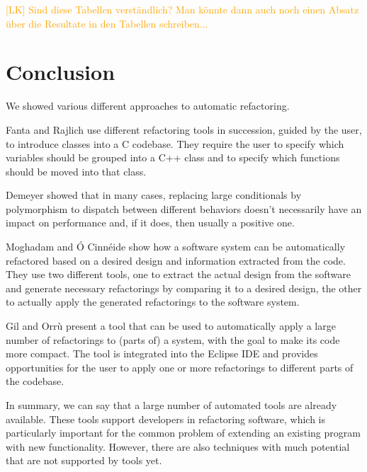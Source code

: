 \documentclass[conference,compsoc,a4paper]{IEEEtran}
\newcommand{\lk}[1]{\textcolor{orange}{[LK] #1}}
\begin{document}
\lk{Sind diese Tabellen verständlich? Man könnte dann auch noch einen Absatz über die Resultate in den Tabellen schreiben...}

\section{Conclusion}

We showed various different approaches to automatic refactoring.

Fanta and Rajlich \cite{cpp} use different refactoring tools in succession, guided by the user, to introduce classes 
into a C codebase. They require the user to specify which variables should be grouped into a C++ class and to specify 
which functions should be moved into that class.

Demeyer \cite{polymorphism} showed that in many cases, replacing large conditionals by polymorphism to dispatch between 
different behaviors doesn't necessarily have an impact on performance and, if it does, then usually a positive one.

Moghadam and Ó Cinnéide \cite{design-diff} show how a software system can be automatically refactored based on a 
desired design and information extracted from the code. They use two different tools, one to extract the actual design 
from the software and generate necessary refactorings by comparing it to a desired design, the other to actually apply 
the generated refactorings to the software system.

Gil and Orrù \cite{sparta} present a tool that can be used to automatically apply a large number of refactorings to 
(parts of) a system, with the goal to make its code more compact. The tool is integrated into the Eclipse IDE and 
provides opportunities for the user to apply one  or more refactorings to different parts of the codebase.

In summary, we can say that a large number of automated tools are already available. These tools support developers in 
refactoring software, which is particularly important for the common problem of extending an existing program with new 
functionality. However, there are also techniques with much potential that are not supported by tools yet.







\end{document}
